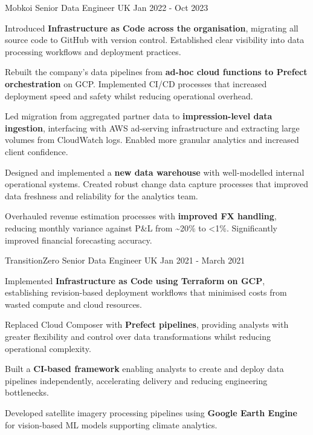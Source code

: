 \begin{cventries}
{    }
  \cventry
    {Mobkoi}
    {Senior Data Engineer}
    {UK} %
    {Jan 2022 - Oct 2023} %
    {
      \begin{cvitems} %
        \item {Introduced \textbf{Infrastructure as Code across the organisation}, migrating all source code to GitHub with version control. Established clear visibility into data processing workflows and deployment practices.}
        \item {Rebuilt the company's data pipelines from \textbf{ad-hoc cloud functions to Prefect orchestration} on GCP. Implemented CI/CD processes that increased deployment speed and safety whilst reducing operational overhead.}
        \item {Led migration from aggregated partner data to \textbf{impression-level data ingestion}, interfacing with AWS ad-serving infrastructure and extracting large volumes from CloudWatch logs. Enabled more granular analytics and increased client confidence.}
        \item {Designed and implemented a \textbf{new data warehouse} with well-modelled internal operational systems. Created robust change data capture processes that improved data freshness and reliability for the analytics team.}
        \item {Overhauled revenue estimation processes with \textbf{improved FX handling}, reducing monthly variance against P\&L from \textasciitilde 20\% to <1\%. Significantly improved financial forecasting accuracy.}
    \end{cvitems}
    }
  \cventry
    {TransitionZero}
    {Senior Data Engineer}
    {UK} %
    {Jan 2021 - March 2021} %
    {
      \begin{cvitems} %
        \item {Implemented \textbf{Infrastructure as Code using Terraform on GCP}, establishing revision-based deployment workflows that minimised costs from wasted compute and cloud resources.}
        \item {Replaced Cloud Composer with \textbf{Prefect pipelines}, providing analysts with greater flexibility and control over data transformations whilst reducing operational complexity.}
        \item {Built a \textbf{CI-based framework} enabling analysts to create and deploy data pipelines independently, accelerating delivery and reducing engineering bottlenecks.}
        \item {Developed satellite imagery processing pipelines using \textbf{Google Earth Engine} for vision-based ML models supporting climate analytics.}

\end{cvitems}}
\end{cventries}
